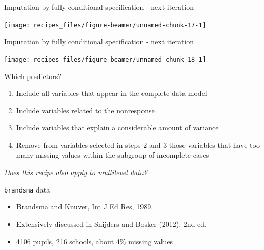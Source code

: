 \documentclass[ignorenonframetext,aspectratio=43]{beamer}
\providecommand{\tightlist}{%
  \setlength{\itemsep}{0pt}\setlength{\parskip}{0pt}}
\begin{document}
\begin{frame}{Imputation by fully conditional specification - next
iteration}

\begin{center}\texttt{[image: recipes\_files/figure-beamer/unnamed-chunk-17-1]} \end{center}

\end{frame}

\begin{frame}{Imputation by fully conditional specification - next
iteration}

\begin{center}\texttt{[image: recipes\_files/figure-beamer/unnamed-chunk-18-1]} \end{center}

\end{frame}

\begin{frame}{Which predictors?}

\begin{enumerate}
\def\labelenumi{\arabic{enumi}.}
\tightlist
\item
  Include all variables that appear in the complete-data model
\item
  Include variables related to the nonresponse
\item
  Include variables that explain a considerable amount of variance
\item
  Remove from variables selected in steps 2 and 3 those variables that
  have too many missing values within the subgroup of incomplete cases
\end{enumerate}

\emph{Does this recipe also apply to multilevel data?}

\end{frame}

\begin{frame}{\texttt{brandsma} data}

\begin{itemize}
\tightlist
\item
  Brandsma and Knuver, Int J Ed Res, 1989.
\item
  Extensively discussed in Snijders and Bosker (2012), 2nd ed.
\item
  4106 pupils, 216 schools, about 4\% missing values
\end{itemize}

\end{frame}
\end{document}
